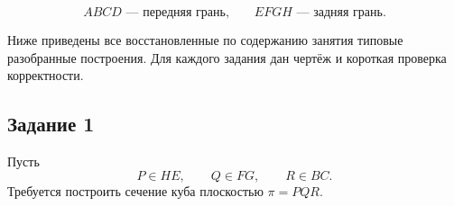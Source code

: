\documentclass[a4paper,12pt]{article}
\newcommand{\Plane}{\ensuremath{\pi}}
\begin{document}
\[
ABCD \text{ --- передняя грань,}
\qquad
EFGH \text{ --- задняя грань.}
\]

Ниже приведены все восстановленные по содержанию занятия типовые
разобранные построения. Для каждого задания дан чертёж и короткая
проверка корректности.


\subsection*{Задание 1}

Пусть
\[
P\in HE,\qquad Q\in FG,\qquad R\in BC.
\]
Требуется построить сечение куба плоскостью $\Plane=PQR$.
\end{document}
